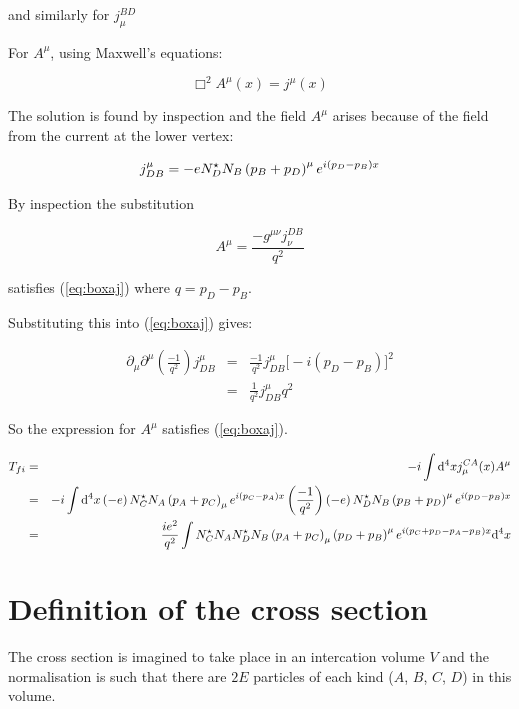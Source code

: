 and similarly for $j^{BD}_{\mu}$

For $A^{\mu}$, using Maxwell's equations:

\begin{equation}
  \Box^2A^{\mu}(x) = j^{\mu}(x) \label{eq:boxaj}
\end{equation}

The solution is found by inspection and the field $A^{\mu}$ arises because of the field from the current at the lower vertex:

\[
  j^{\mu}_{DB} = -e N^{\star}_DN_B\left(p_B + p_D\right)^{\mu}e^{i\left(p_D-p_B\right)x}
\]

By inspection the substitution

\[
  A^{\mu} = \frac{-g^{\mu\nu}j^{DB}_{\nu}}{q^2}
\]

satisfies (\ref{eq:boxaj}) where $q = p_D - p_B$.

Substituting this into (\ref{eq:boxaj}) gives:

\begin{eqnarray*}
  \partial_{\mu}\partial^{\mu}\left(\frac{-1}{q^2}\right)j^{\mu}_{DB} & = & \frac{-1}{q^2}j^{\mu}_{DB}\Big[-i\left(p_D-p_B\right)\Big]^2 \\
  & = & \frac{1}{q^2}j^{\mu}_{DB}q^2
\end{eqnarray*}

So the expression for $A^{\mu}$ satisfies (\ref{eq:boxaj}).

\begin{eqnarray*}
  T_{fi} & = & -i\int\mathrm{d}^4xj^{CA}_{\mu}(x)A^{\mu} \\
  & = & -i\int\mathrm{d}^4x\left(-e\right)N^{\star}_CN_A\left(p_A + p_C\right)_{\mu}e^{i\left(p_C-p_A\right)x}\left(\frac{-1}{q^2}\right)\left(-e\right)N^{\star}_DN_B\left(p_B + p_D\right)^{\mu}e^{i\left(p_D-p_B\right)x} \\
  & = & \frac{ie^2}{q^2}\int N^{\star}_CN_AN^{\star}_DN_B\left(p_A+p_C\right)_{\mu}\left(p_D+p_B\right)^{\mu}e^{i\left(p_C+p_D-p_A-p_B\right)x}\mathrm{d}^4x
\end{eqnarray*}

\section{Definition of the cross section}

The cross section is imagined to take place in an intercation volume $V$ and the normalisation is such that there are $2E$ particles of each kind ($A$, $B$, $C$, $D$) in this volume.

